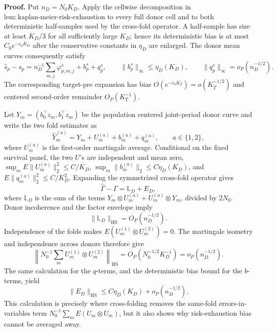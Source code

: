 \textbf{Proof.}
Put \(n_D=N_0K_D\).  Apply the cellwise decomposition in \(\mathrm{lem:kaplan\mbox{-}meier\mbox{-}risk\mbox{-}exhaustion}\) to every full donor cell and to both deterministic half-samples used by the cross-fold operator.  A half-sample has size at least \(K_D/3\) for all sufficiently large \(K_D\); hence its deterministic bias is at most \(C_0e^{-c_0K_D}\) after the conservative constants in \(\eta_D\) are enlarged.  The donor mean curves consequently satisfy
\[
 \widehat s_p-s_p
 =n_D^{-1}\sum_{m,j}\varphi^{s}_{p,m,j}+b^s_p+q^s_p,\qquad
 \|b^s_p\|_\infty\le\eta_D(K_D),\qquad
 \|q^s_p\|_\infty=o_P(n_D^{-1/2}).
\]
The corresponding target-pre expansion has bias \(O(e^{-c_0K_T})=o(K_T^{-1/2})\) and centered second-order remainder \(O_P(K_T^{-1})\).

Let \(Y_m=(b_0^\top z_m,b_1^\top z_m)\) be the population centered joint-period donor curve and write the two fold estimates as
\[
 \widehat Y_m^{(a)}=Y_m+U_m^{(a)}+b_m^{(a)}+q_m^{(a)},\qquad a\in\{1,2\},
\]
where \(U_m^{(a)}\) is the first-order martingale average.  Conditional on the fixed survival panel, the two \(U\)'s are independent and mean zero, \(\sup_mE\|U_m^{(a)}\|_2^2\le C/K_D\), \(\sup_m\|b_m^{(a)}\|_2\le C\eta_D(K_D)\), and \(E\|q_m^{(a)}\|_2^2\le C/K_D^2\).  Expanding the symmetrized cross-fold operator gives
\[
 \widehat\Gamma-\Gamma=\mathbb L_D+E_D,
\]
where \(\mathbb L_D\) is the sum of the terms \(Y_m\otimes U_m^{(a)}+U_m^{(a)}\otimes Y_m\), divided by \(2N_0\).  Donor incoherence and the factor envelope imply
\[
 \|\mathbb L_D\|_{\mathrm{HS}}=O_P(n_D^{-1/2}).
\]
Independence of the folds makes \(E(U_m^{(1)}\otimes U_m^{(2)})=0\).  The martingale isometry and independence across donors therefore give
\[
 \left\|N_0^{-1}\sum_mU_m^{(1)}\otimes U_m^{(2)}\right\|_{\mathrm{HS}}
 =O_P(N_0^{-1/2}K_D^{-1})=o_P(n_D^{-1/2}).
\]
The same calculation for the \(q\)-terms, and the deterministic bias bound for the \(b\)-terms, yield
\[
 \|E_D\|_{\mathrm{HS}}\le C\eta_D(K_D)+o_P(n_D^{-1/2}).
\]
This calculation is precisely where cross-folding removes the same-fold errors-in-variables term \(N_0^{-1}\sum_mE(U_m\otimes U_m)\), but it also shows why risk-exhaustion bias cannot be averaged away.

